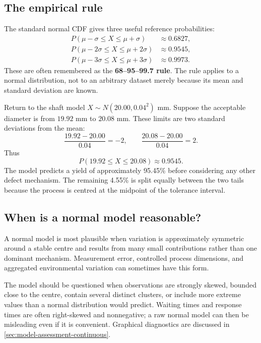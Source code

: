 \subsection{The empirical rule}

The standard normal CDF gives three useful reference probabilities:
\[
\begin{aligned}
P(\mu-\sigma\leq X\leq\mu+\sigma)&\approx0.6827,\\
P(\mu-2\sigma\leq X\leq\mu+2\sigma)&\approx0.9545,\\
P(\mu-3\sigma\leq X\leq\mu+3\sigma)&\approx0.9973.
\end{aligned}
\]
These are often remembered as the \textbf{68--95--99.7 rule}. The rule applies to a normal distribution, not to an arbitrary dataset merely because its mean and standard deviation are known.

\begin{example}\par
Return to the shaft model $X\sim N(20.00,0.04^2)$ mm. Suppose the acceptable diameter is from $19.92$ mm to $20.08$ mm. These limits are two standard deviations from the mean:
\[
    \frac{19.92-20.00}{0.04}=-2,
    \qquad
    \frac{20.08-20.00}{0.04}=2.
\]
Thus
\[
    P(19.92\leq X\leq20.08)\approx0.9545.
\]
The model predicts a yield of approximately 95.45\% before considering any other defect mechanism. The remaining 4.55\% is split equally between the two tails because the process is centred at the midpoint of the tolerance interval.
\end{example}

\subsection{When is a normal model reasonable?}

A normal model is most plausible when variation is approximately symmetric around a stable centre and results from many small contributions rather than one dominant mechanism. Measurement error, controlled process dimensions, and aggregated environmental variation can sometimes have this form.

The model should be questioned when observations are strongly skewed, bounded close to the centre, contain several distinct clusters, or include more extreme values than a normal distribution would predict. Waiting times and response times are often right-skewed and nonnegative; a raw normal model can then be misleading even if it is convenient. Graphical diagnostics are discussed in \autoref{sec:model-assessment-continuous}.

